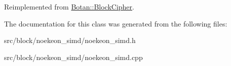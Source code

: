 Reimplemented from \hyperlink{classBotan_1_1BlockCipher_a635a1c3ed1084be78cf1b9e655ab1465}{Botan\-::\-Block\-Cipher}.



The documentation for this class was generated from the following files\-:\begin{DoxyCompactItemize}
\item 
src/block/noekeon\-\_\-simd/noekeon\-\_\-simd.\-h\item 
src/block/noekeon\-\_\-simd/noekeon\-\_\-simd.\-cpp\end{DoxyCompactItemize}
